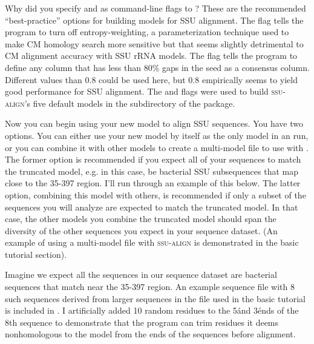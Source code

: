 
\begin{srefaq}{Why did you specify  and
     as command-line flags to ?}
    These are the recommended ``best-practice'' options for building
    models for SSU alignment. The  flag tells the
    program to turn off entropy-weighting, a parameterization
    technique used to make CM homology search more sensitive
    \cite{Nawrocki07} but that seems slightly detrimental to CM
    alignment accuracy with SSU rRNA models. The  flag tells the program to define any column that has less
    than 80\% gaps in the seed as a consensus column. Different values
    than 0.8 could be used here, but 0.8 empirically seems to yield
    good performance for SSU alignment. The  and
     flags were used to build
    \textsc{ssu-align}'s five default models in the 
    subdirectory of the package.
\end{srefaq}

Now you can begin using your new model  to align
SSU sequences. You have two options.  You can either use your new
model by itself as the only model in an  run, or you
can combine it with other models to create a multi-model file to use
with . The former option is recommended if you expect
all of your sequences to match the truncated model, e.g. in this case,
be bacterial SSU subsequences that map close to the 35-397
region. I'll run through an example of this below. The latter option,
combining this model with others, is recommended if only a subset of
the sequences you will analyze are expected to match the truncated
model. In that case, the other models you combine the truncated model
should span the diversity of the other sequences you expect in your
sequence dataset. (An example of using a multi-model file with
\textsc{ssu-align} is demonstrated in the basic tutorial section).

Imagine we expect all the sequences in our sequence dataset are
bacterial sequences that match near the 35-397 region. An example
sequence file with 8 such sequences derived from larger sequences in
the  file used in the basic tutorial is included in
. I artificially added 10 random residues to the 5\' and 3\'
ends of the 8th sequence to demonstrate that the program can 
trim residues it deems nonhomologous to the model from the ends of
the sequences before alignment.

